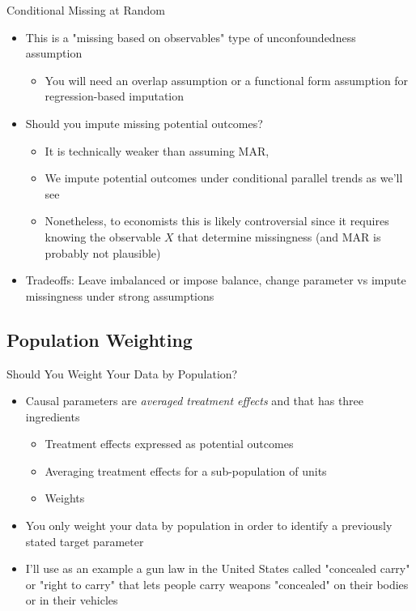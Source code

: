 \documentclass{beamer}
\begin{document}
\begin{frame}{Conditional Missing at Random}

\begin{itemize}
    \item This is a "missing based on observables" type of unconfoundedness assumption
	\begin{itemize}
	    \item You will need an overlap assumption or a functional form assumption for regression-based imputation
	    \end{itemize}
    \item Should you impute missing potential outcomes?  
    	\begin{itemize}
	\item It is technically weaker than assuming MAR, 
	\item We impute potential outcomes under conditional parallel trends as we'll see
	\item Nonetheless, to economists this is likely controversial since it requires knowing the observable $X$ that determine missingness (and MAR is probably not plausible)
	\end{itemize}
    \item Tradeoffs: Leave imbalanced or impose balance, change parameter vs impute missingness under strong assumptions

\end{itemize}

\end{frame}



\subsection{Population Weighting}



\begin{frame}{Should You Weight Your Data by Population?}

\begin{itemize}
\item Causal parameters are \emph{averaged treatment effects} and that has three ingredients
	\begin{itemize}
	\item Treatment effects expressed as potential outcomes
	\item Averaging treatment effects for a sub-population of units
	\item Weights
	\end{itemize}
\item You only weight your data by population in order to identify a previously stated target parameter
\item I'll use as an example a gun law in the United States called "concealed carry" or "right to carry" that lets people carry weapons "concealed" on their bodies or in their vehicles
\end{itemize}

\end{frame}
\end{document}
